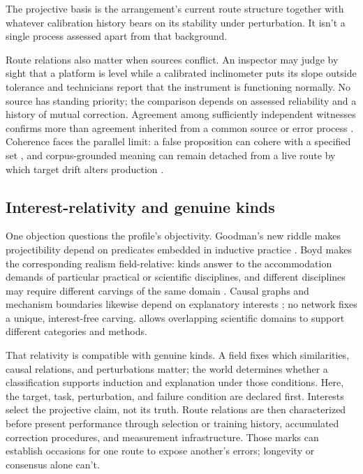 \documentclass[12pt]{article}
\begin{document}
The projective basis is the arrangement's current route structure together with
whatever calibration history bears on its stability under perturbation. It isn't a single
process assessed apart from that background.

Route relations also matter when sources conflict. An inspector may judge by sight that a
platform is level while a calibrated inclinometer puts its slope outside tolerance and
technicians report that the instrument is functioning normally. No source has standing
priority; the comparison depends on assessed reliability and a history of mutual
correction. Agreement among sufficiently independent witnesses confirms more than
agreement inherited from a common source or error process
\citep{bovens_hartmann_2003_bayesian_epistemology,olsson_2005_against_coherence}.
Coherence faces the parallel limit: a false proposition can cohere with a specified set
\citep{russell_1907_nature_truth}, and corpus-grounded meaning can remain detached from a
live route by which target drift alters production
\citep{havlik_2024_meaning_understanding_llms_synthese}.

\subsection{Interest-relativity and genuine kinds}

One objection questions the profile's objectivity. Goodman's new riddle makes
projectibility depend on predicates embedded in inductive practice
\citep{Goodman1955}. Boyd makes the corresponding realism field-relative: kinds answer to
the accommodation demands of particular practical or scientific disciplines, and different
disciplines may require different carvings of the same domain \citep{boyd1991,boyd1999}.
Causal graphs and mechanism boundaries likewise depend on explanatory interests
\citep{craver_2009,onishi_serpico_2022}; no network fixes a unique, interest-free carving.
\textcite{khalidi2013} allows overlapping scientific domains to support different categories
and methods.

That relativity is compatible with genuine kinds. A field fixes which similarities, causal
relations, and perturbations matter; the world determines whether a classification supports
induction and explanation under those conditions. Here, the target, task, perturbation, and
failure condition are declared first. Interests select the projective claim, not its truth.
Route relations are then characterized before present performance through selection or
training history, accumulated correction procedures, and measurement infrastructure. Those
marks can establish occasions for one route to expose another's errors; longevity or
consensus alone can't.
\end{document}
